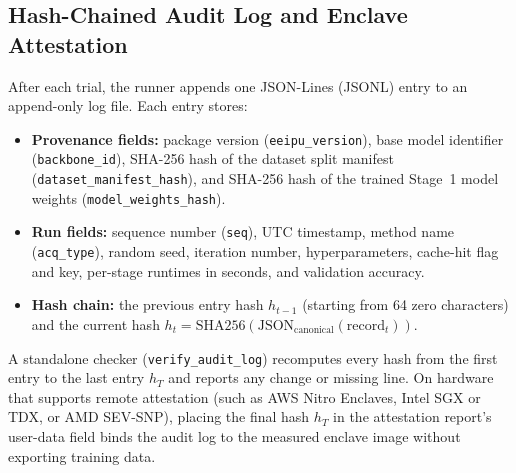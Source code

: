 \documentclass[11pt,letterpaper]{article}
\begin{document}
\subsection{Hash-Chained Audit Log and Enclave Attestation}
After each trial, the runner appends one JSON-Lines (JSONL) entry to an append-only log file. Each entry stores:
\begin{itemize}
  \item \textbf{Provenance fields:} package version (\texttt{eeipu\_version}), base model identifier (\texttt{backbone\_id}), SHA-256 hash of the dataset split manifest (\texttt{dataset\_manifest\_hash}), and SHA-256 hash of the trained Stage~1 model weights (\texttt{model\_weights\_hash}).
  \item \textbf{Run fields:} sequence number (\texttt{seq}), UTC timestamp, method name (\texttt{acq\_type}), random seed, iteration number, hyperparameters, cache-hit flag and key, per-stage runtimes in seconds, and validation accuracy.
  \item \textbf{Hash chain:} the previous entry hash $h_{t-1}$ (starting from 64 zero characters) and the current hash $h_t = \mathrm{SHA256}(\mathrm{JSON}_{\text{canonical}}(\text{record}_t))$.
\end{itemize}
A standalone checker (\texttt{verify\_audit\_log}) recomputes every hash from the first entry to the last entry $h_T$ and reports any change or missing line. On hardware that supports remote attestation (such as AWS Nitro Enclaves, Intel SGX or TDX, or AMD SEV-SNP), placing the final hash $h_T$ in the attestation report's user-data field binds the audit log to the measured enclave image without exporting training data.
\end{document}

